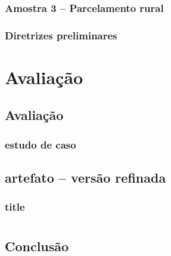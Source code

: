 \documentclass[12pt, a4paper]{book} %
\begin{document}
            \section{Amostra 3 – Parcelamento rural}
            \section{Diretrizes preliminares}



    \part[Avaliação]{Avaliação}

        \chapter[Avaliação]{Avaliação}
            \section[Comparativo com existente]{estudo de caso}

            \section[Grupo focal e \textit{feedback}]{}

        \chapter[Diretrizes projetuais]{artefato – versão refinada}

            \section[Comunicação do artefato aos \textit{stakeholders}]{title}


    \part*{}

        \chapter*{Conclusão}
\end{document}
